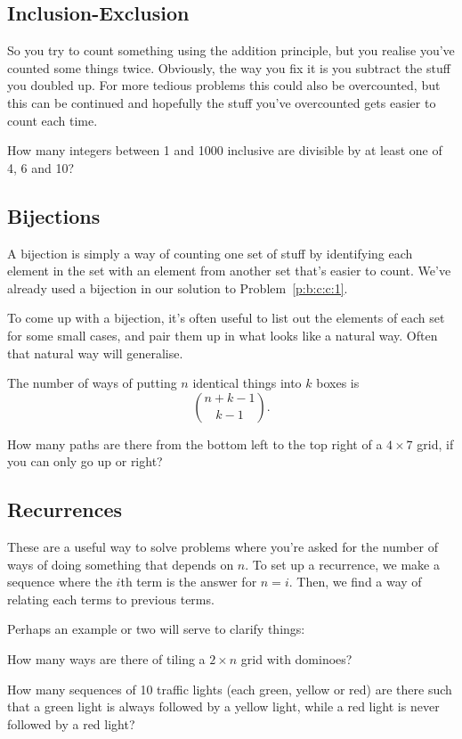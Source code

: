 \subsection{Inclusion-Exclusion}
So you try to count something using the addition principle, but you realise
you've counted some things twice. Obviously, the way you fix it is you subtract
the stuff you doubled up. For more tedious problems this could also be
overcounted, but this can be continued and hopefully the stuff you've
overcounted gets easier to count each time.
\begin{problem}{\label{p:b:c:pie:1}}
  How many integers between 1 and 1000 inclusive are divisible by at least one
  of 4, 6 and 10?
\end{problem}
\subsection{Bijections}
A bijection is simply a way of counting one set of stuff by identifying each
element in the set with an element from another set that's easier to count.
We've already used a bijection in our solution to Problem~\ref{p:b:c:c:1}.

To come up with a bijection, it's often useful to list out the elements of each
set for some small cases, and pair them up in what looks like a natural way.
Often that natural way will generalise.

\begin{result}
  The number of ways of putting $n$ identical things into $k$ boxes is
  \[\binom{n+k-1}{k-1}.\]
\end{result}
\begin{problem}{\label{p:b:c:b:1}}
  How many paths are there from the bottom left to the top right of a $4\times
  7$ grid, if you can only go up or right?
\end{problem}
\subsection{Recurrences}
These are a useful way to solve problems where you're asked for the number
of ways of doing something that depends on $n$. To set up a recurrence, we make
a sequence where the $i$th term is the answer for $n=i$. Then, we find a way of
relating each terms to previous terms.

Perhaps an example or two will serve to clarify things:
\begin{problem}{\label{p:b:c:r:1}}
  How many ways are there of tiling a $2\times n$ grid with dominoes?
\end{problem}
\begin{problem}{\label{p:b:c:r:2}}
  How many sequences of 10 traffic lights (each green, yellow or red) are there
  such that a green light is always followed by a yellow light, while a red light
  is never followed by a red light?
\end{problem}
